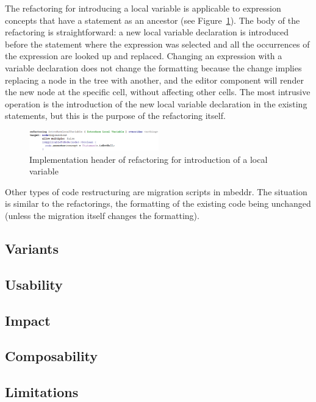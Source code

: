 \documentclass[preprint,numbers,10pt]{sigplanconf}
\begin{document}
The refactoring for introducing a local variable is applicable to expression concepts that have a statement as an
ancestor (see Figure~\ref{fig:RefactoringImpl}). The body of the refactoring is straightforward:
a new local variable declaration is introduced before the statement where the expression was selected and all
the occurrences of the expression are looked up and replaced. Changing an expression with a variable declaration
does not change the formatting because the change implies replacing a node in the tree with another, and the editor
component will render the new node at the specific cell, without affecting other cells. The most intrusive operation is the
introduction of the new local variable declaration in the existing statements, but this is the purpose of the
refactoring itself.

\begin{figure}[H]
	\centering
	\includegraphics[width=0.50\textwidth]{screens/RefactoringImpl.png}
	\caption{Implementation header of refactoring for introduction of a local variable}
	\label{fig:RefactoringImpl}
\end{figure}

Other types of code restructuring are migration scripts in mbeddr. The situation is similar to the refactorings, the
formatting of the existing code being unchanged (unless the migration itself changes the formatting).
\subsection{Variants}

\subsection{Usability}

\subsection{Impact}

\subsection{Composability}

\subsection{Limitations}
\end{document}
